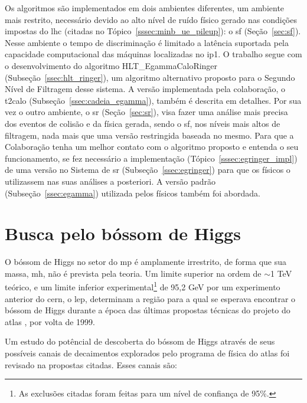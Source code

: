 Os algoritmos são implementados em dois ambientes diferentes, um ambiente mais
restrito, necessário devido ao alto nível de ruído físico gerado nas condições 
impostas do \gls{lhc} (citadas no Tópico~\ref{sssec:minb_ue_pileup}): o
\glsdesc{sf} (Seção~\ref{sec:sf}). Nesse ambiente o tempo de discriminação 
é limitado a latência suportada pela capacidade computacional das máquinas localizadas 
no \gls{ip}1. O trabalho segue com o desenvolvimento do algoritmo HLT\_EgammaCaloRinger 
(Subseção~\ref{ssec:hlt_ringer}), um algoritmo alternativo proposto para o
Segundo Nível de Filtragem desse sistema. A versão implementada pela
colaboração, o \gls{t2calo} (Subseção~\ref{ssec:cadeia_egamma}), 
também é descrita em detalhes. Por sua vez o outro ambiente, o \glsdesc{sr}
(Seção~\ref{sec:sr}), visa fazer uma análise mais precisa dos eventos de colisão e da 
física gerada, sendo o \glsdesc{sf}, nos níveis mais altos de filtragem, 
nada mais que uma versão restringida baseada no mesmo. Para que a Colaboração tenha 
um melhor contato com o algoritmo proposto e entenda o seu funcionamento, se fez
necessário a implementação (Tópico~\ref{sssec:egringer_impl}) de uma versão no Sistema 
de \glsdesc{sr} (Subseção~\ref{ssec:egringer}) para que os físicos o utilizassem nas suas 
análises a posteriori. A versão padrão (Subseção~\ref{ssec:egamma}) utilizada
pelos físicos também foi abordada.


\section{Busca pelo bóssom de Higgs}
\label{sec:busca_higgs}


O bóssom de Higgs no setor do \gls{mp} é amplamente irrestrito, de forma que sua
massa, \acrshort{mh}, não é prevista pela teoria. Um limite superior na ordem de
$\sim$1 TeV teórico, e um limite inferior experimental\footnote{As exclusões
citadas foram feitas para um nível de confiança de 95\%.\label{fn:95cl}} de 95,2
GeV \cite{lep_higgs_1999} por um experimento anterior do \gls{cern}, o \gls{lep}, determinam a região para a qual
se esperava encontrar o bóssom de Higgs durante a época das últimas propostas técnicas
do projeto do \gls{atlas} \cite{ATLAS_TDR,ATLAS_TDR2}, por volta de 1999. 

Um estudo do potêncial de descoberta do bóssom de Higgs através de seus
possíveis canais de decaimentos explorados pelo programa de física do
\gls{atlas} foi revisado na propostas citadas. Esses canais são:

